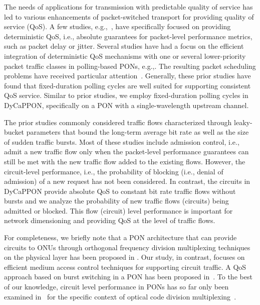 \documentclass[article]{IEEEtran}
\begin{document}
The needs of applications for transmission
with predictable quality of service has led to various
enhancements of packet-switched transport for providing quality of
service (QoS).
A few studies, e.g.,~\cite{BeBM09,Ho06,MZC0303,Qin13,ZhAY03,ZhP04},
have specifically focused on providing deterministic QoS, i.e.,
absolute guarantees for packet-level performance metrics,
such as packet delay or jitter.
Several studies have had a focus on the efficient integration of
deterministic QoS mechanisms with one or several
lower-priority packet traffic classes in polling-based
PONs, e.g.,\cite{AHKWK0703,BeIB11,DhAMS07,HwLLL12,LiLC11,Merayo2010,NgGB11}.
The resulting packet scheduling problems have received
particular attention~\cite{De12,PeFA09,YiP10}.
Generally, these prior studies have found that fixed-duration
polling cycles are well suited for supporting consistent
QoS service.
Similar to prior studies, we employ fixed-duration polling
cycles in DyCaPPON, specifically on a PON with a single-wavelength
upstream channel.

The prior studies commonly considered traffic flows characterized
through leaky-bucket parameters that bound the long-term average
bit rate as well as the size of sudden traffic bursts.
Most of these studies include admission control, i.e., admit
a new traffic flow only when the packet-level performance
guarantees can still be met with the new traffic flow
added to the existing flows.
However, the circuit-level performance, i.e., the probability of
blocking (i.e., denial of admission) of a new request has not
been considered.
In contrast, the circuits in
DyCaPPON provide absolute QoS to constant bit rate
traffic flows without bursts and we analyze the probability
of new traffic flows (circuits) being admitted or blocked.
This flow (circuit) level performance is important
for network dimensioning and providing QoS at the level of
traffic flows.

For completeness, we briefly note that a PON
architecture that can provide circuits to ONUs through
orthogonal frequency division multiplexing techniques on the
physical layer has been proposed in \cite{OFDMPON}.
Our study, in contrast, focuses on efficient medium access control
techniques for supporting circuit traffic.
A QoS approach based on burst switching in a PON has been proposed
in~\cite{SeBP05}.
To the best of our knowledge, circuit level performance
in PONs has so far only been examined in~\cite{VaML12} for
the specific context of optical code division
multiplexing~\cite{KwYZ96}.
\end{document}
